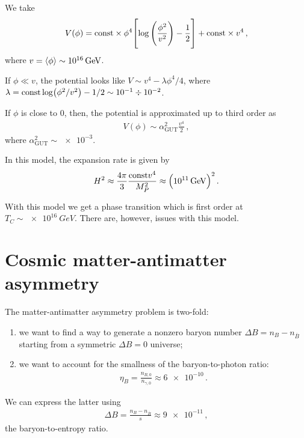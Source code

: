 \documentclass[main.tex]{subfiles}
\begin{document}
We take 
%
\begin{align}
V(\phi ) = \text{const} \times \phi^{4} \qty[\log \qty( \frac{\phi^2}{v^2}) - \frac{1}{2}] + \text{const} \times v^4
\,,
\end{align}
%
where \(v = \expval{\phi } \sim \SI{e16}{GeV}\). 

If \(\phi \ll v\), the potential looks like \(V \sim v^{4} - \lambda \phi^{4} / 4\), where \(\lambda = \const \log (\phi^2 / v^2) - 1/2 \sim \num{e-1} \divisionsymbol \num{e-2}\). 

If \(\phi \) is close to 0, then, the potential is approximated up to third order as 
%
\begin{align}
V(\phi ) \sim \alpha^2 _{\text{GUT}} \frac{v^{4}}{2}
\,,
\end{align}
%
where \(\alpha^2 _{\text{GUT}} \sim \num{e-3}\). 

In this model, the expansion rate is given by 
%
\begin{align}
H^2 \approx \frac{4 \pi }{3} \frac{\text{const} v^{4}}{M_P^2} \approx \qty( \SI{e11}{GeV})^2
\,.
\end{align}

With this model we get a phase transition which is first order at \(T_C \sim \SI{e16}{GeV}\).
There are, however, issues with this model. 


\section{Cosmic matter-antimatter asymmetry}

The matter-antimatter asymmetry problem is two-fold: 
\begin{enumerate}
    \item we want to find a way to generate a nonzero baryon number \(\Delta B = n_B - n_{\overline{B}}\) starting from a symmetric \(\Delta B = 0\) universe;
    \item we want to account for the smallness of the baryon-to-photon ratio: 
    \begin{align}
    \eta_{B} = \frac{n_{B, 0}}{n_{\gamma , 0}} \approx \num{6e-10}
    \,.
    \end{align}
\end{enumerate}

We can express the latter using 
%
\begin{align}
\Delta B = \frac{n_B - n_{\overline{B}}}{s} \approx \num{9e-11}
\,,
\end{align}
%
the baryon-to-entropy ratio. 
\end{document}
